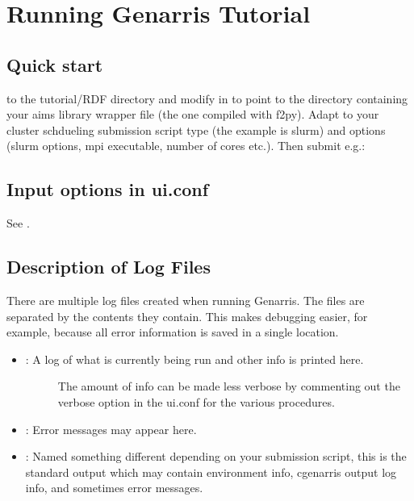 \documentclass[letterpaper,10pt,english]{sphinxmanual}
\begin{document}
\chapter{Running Genarris Tutorial}
\label{\detokenize{index:running-genarris-tutorial}}

\section{Quick start}
\label{\detokenize{index:quick-start}}
 to the tutorial/RDF directory and modify  in 
to point to the directory containing your aims library wrapper file (the one compiled
with f2py). Adapt  to your cluster schdueling submission script
type (the example is slurm) and options (slurm options, mpi executable, number
of cores etc.). Then submit e.g.:

\begin{sphinxVerbatim}[commandchars=\\\{\}]
 
\end{sphinxVerbatim}


\section{Input options in ui.conf}
\label{\detokenize{index:input-options-in-ui-conf}}
See {\hyperref[\detokenize{index:documentation}]{}}.


\section{Description of Log Files}
\label{\detokenize{index:description-of-log-files}}
There are multiple log files created when running Genarris. The files are
separated by the contents they contain. This makes debugging easier, for example,
because all error information is saved in a single location.
\begin{itemize}
\item {} \begin{description}
\item[{: A log of what is currently being run and other info is printed here.}] \leavevmode
The amount of info can be made less verbose by commenting out the verbose
option in the ui.conf for the various procedures.

\end{description}

\item {} 
: Error messages may appear here.

\item {} 
: Named something different depending on your submission script,
this is the standard output which may contain environment info,
cgenarris output log info, and sometimes error messages.

\end{itemize}
\end{document}
